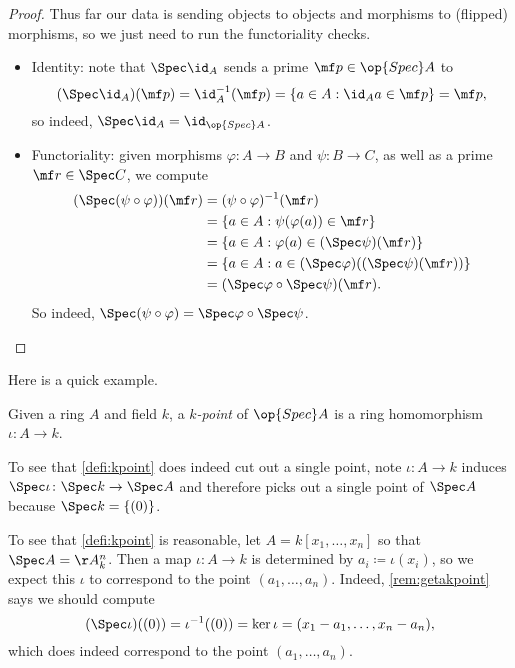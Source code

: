 \documentclass[../notes.tex]{subfiles}
\begin{document}
\begin{proof}
	Thus far our data is sending objects to objects and morphisms to (flipped) morphisms, so we just need to run the functoriality checks.
	\begin{itemize}
		\item Identity: note that $\Spec\id_A$ sends a prime $\mf p\in\op{Spec}A$ to
		\[(\Spec\id_A)(\mf p)=\id_A^{-1}(\mf p)=\{a\in A:\id_Aa\in\mf p\}=\mf p,\]
		so indeed, $\Spec\id_A=\id_{\op{Spec}A}$.
		\item Functoriality: given morphisms $\varphi\colon A\to B$ and $\psi\colon B\to C$, as well as a prime $\mf r\in\Spec C$, we compute
		\begin{align*}
			(\Spec(\psi\circ\varphi))(\mf r) &= (\psi\circ\varphi)^{-1}(\mf r) \\
			&= \{a\in A:\psi(\varphi(a))\in\mf r\} \\
			&= \left\{a\in A:\varphi(a)\in(\Spec\psi)(\mf r)\right\} \\
			&= \left\{a\in A:a\in(\Spec\varphi)((\Spec\psi)(\mf r))\right\} \\
			&= (\Spec\varphi\circ\Spec\psi)(\mf r).
		\end{align*}
		So indeed, $\Spec(\psi\circ\varphi)=\Spec\varphi\circ\Spec\psi$.
		\qedhere
	\end{itemize}
\end{proof}
Here is a quick example.
\begin{defihelper}  \label{defi:kpoint}
	Given a ring $A$ and field $k$, a \textit{$k$-point} of $\op{Spec}A$ is a ring homomorphism $\iota\colon A\to k$.
\end{defihelper}
\begin{remark} \label{rem:getakpoint}
	To see that \autoref{defi:kpoint} does indeed cut out a single point, note $\iota\colon A\to k$ induces $\Spec\iota\colon\Spec k\to\Spec A$ and therefore picks out a single point of $\Spec A$ because $\Spec k=\{(0)\}$.
\end{remark}
\begin{remark}
	To see that \autoref{defi:kpoint} is reasonable, let $A=k[x_1,\ldots,x_n]$ so that $\Spec A=\AA^n_k$. Then a map $\iota\colon A\to k$ is determined by $a_i\coloneqq\iota(x_i)$, so we expect this $\iota$ to correspond to the point $(a_1,\ldots,a_n)$. Indeed, \autoref{rem:getakpoint} says we should compute
	\[(\Spec\iota)((0))=\iota^{-1}((0))=\ker\iota=(x_1-a_1,\ldots,x_n-a_n),\]
	which does indeed correspond to the point $(a_1,\ldots,a_n)$.
\end{remark}
\end{document}
